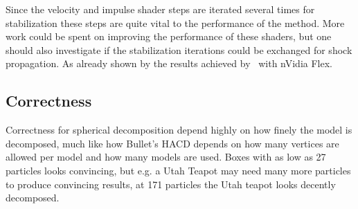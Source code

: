 Since the velocity and impulse shader steps are iterated
several times for stabilization these steps are quite vital to the performance
of the method. More work could be spent on improving the performance of these shaders,
but one should also investigate if the stabilization iterations could be exchanged for
shock propagation. As already shown by the results achieved by~\cite{flex} with nVidia Flex.

\subsection{Correctness}
Correctness for spherical decomposition depend highly on how finely the model is
decomposed, much like how Bullet's HACD depends on how many vertices are allowed
per model and how many models are used. Boxes with as low as 27 particles looks convincing, but e.g. a Utah Teapot
may need many more particles to produce convincing results, at 171 particles the
Utah teapot looks decently decomposed.

